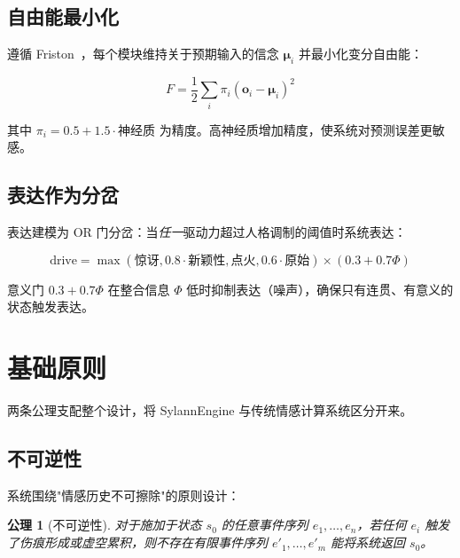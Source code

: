 \documentclass[UTF8,11pt]{ctexart}
\newtheorem{axiom}{公理}[section]
\begin{document}
\subsection{自由能最小化}
\label{sec:freeenergy}

遵循 Friston~\cite{friston2010}，每个模块维持关于预期输入的信念 $\boldsymbol{\mu}_i$ 并最小化变分自由能：

\begin{equation}
F = \frac{1}{2}\sum_i \pi_i (\mathbf{o}_i - \boldsymbol{\mu}_i)^2
\end{equation}

其中 $\pi_i = 0.5 + 1.5 \cdot \text{神经质}$ 为精度。高神经质增加精度，使系统对预测误差更敏感。

\subsection{表达作为分岔}
\label{sec:expression}

表达建模为 OR 门分岔：当\emph{任一}驱动力超过人格调制的阈值时系统表达：

\begin{equation}
\text{drive} = \max(\text{惊讶}, 0.8 \cdot \text{新颖性}, \text{点火}, 0.6 \cdot \text{原始}) \times (0.3 + 0.7\Phi)
\end{equation}

意义门 $0.3 + 0.7\Phi$ 在整合信息 $\Phi$ 低时抑制表达（噪声），确保只有连贯、有意义的状态触发表达。

\section{基础原则}
\label{sec:principles}

两条公理支配整个设计，将 SylannEngine 与传统情感计算系统区分开来。

\subsection{不可逆性}
\label{sec:irreversibility}

系统围绕"情感历史不可擦除"的原则设计：

\begin{axiom}[不可逆性]
对于施加于状态 $s_0$ 的任意事件序列 $e_1, \ldots, e_n$，若任何 $e_i$ 触发了伤痕形成或虚空累积，则不存在有限事件序列 $e'_1, \ldots, e'_m$ 能将系统返回 $s_0$。
\end{axiom}
\end{document}
